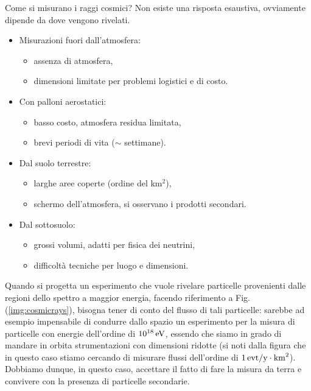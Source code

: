 Come si misurano i raggi cosmici? Non esiste una risposta esaustiva, ovviamente dipende da dove vengono rivelati.
\begin{itemize}
    \item Misurazioni fuori dall'atmosfera:
    \begin{itemize}
        \item assenza di atmosfera,
        \item dimensioni limitate per problemi logistici e di costo.
    \end{itemize}
    \item Con palloni aerostatici:
    \begin{itemize}
        \item basso costo, atmosfera residua limitata,
        \item brevi periodi di vita ($\sim$ settimane).
    \end{itemize}
    \item Dal suolo terrestre:
    \begin{itemize}
        \item larghe aree coperte (ordine del km$^2$),
        \item schermo dell'atmosfera, si osservano i prodotti secondari.
    \end{itemize}
    \item Dal sottosuolo:
    \begin{itemize}
        \item grossi volumi, adatti per fisica dei neutrini,
        \item difficoltà tecniche per luogo e dimensioni.
    \end{itemize}
\end{itemize}
Quando si progetta un esperimento che vuole rivelare particelle provenienti dalle regioni dello spettro a maggior energia, facendo riferimento a Fig.(\ref{img:cosmicrays}), bisogna tener di conto del flusso di tali particelle: sarebbe ad esempio impensabile di condurre dallo spazio un esperimento per la misura di particelle con energie dell'ordine di $10^{18}\,\textup{eV}$, essendo che siamo in grado di mandare in orbita strumentazioni con dimensioni ridotte (si noti dalla figura che in questo caso stiamo cercando di misurare flussi dell'ordine di $1\,\textup{evt}/\textup{y}\cdot\textup{km}^2$). Dobbiamo dunque, in questo caso, accettare il fatto di fare la misura da terra e convivere con la presenza di particelle secondarie.

